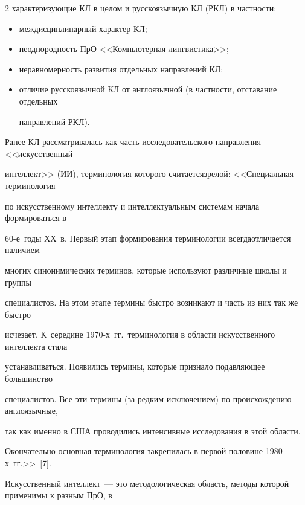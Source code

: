 \begin{multicols}{2}
характеризующие КЛ в целом и русскоязычную КЛ (РКЛ) в частности:

  \begin{itemize}

\item  междисциплинарный характер КЛ;

  \item неоднородность ПрО <<Компьютерная лингвистика>>;

  \item неравномерность развития отдельных на\-прав\-ле\-ний КЛ;

  \item отличие русскоязычной КЛ от англоязычной (в частности, отставание отдельных 

направлений РКЛ).

  \end{itemize}

  

  Ранее КЛ рассматривалась как часть исследовательского направления <<искусственный 

интеллект>> (ИИ), терминология которого считается\linebreak зрелой: <<Специальная терминология 

по искусственному интеллекту и интеллектуальным системам начала формироваться в 

  60-е~годы ХХ~в. Первый этап формирования терминологии всегда\linebreak отличается наличием 

многих синонимических терминов, которые используют различные школы и группы 

специалистов. На этом этапе термины быстро возникают и часть из них так же быстро 

исчезает. К~середине 1970-х~гг.\ терминология в области искусственного интеллекта стала 

уста\-нав\-ли\-вать\-ся. Появились термины, которые признало подавляющее большинство 

специалистов. Все эти термины (за редким исключением) по происхождению англоязычные, 

так как именно в США проводились интенсивные исследования в этой области. 

Окончательно основная терминология закрепилась в первой половине 1980-х~гг.>>~[7]. 

  

  Искусственный интеллект~--- это методологическая область, методы которой применимы к разным ПрО, в 


\end{multicols}
